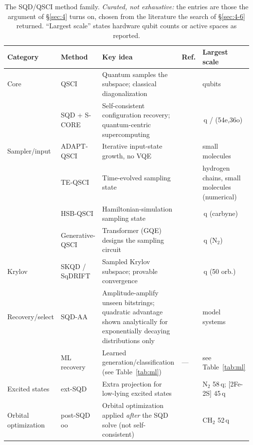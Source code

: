 \documentclass[onecolumn,a4paper]{quantumarticle}
\begin{document}
\begin{table}[t]\centering\footnotesize
\caption{The SQD/QSCI method family. \emph{Curated, not exhaustive:} the entries are those the argument of \S\ref{sec:4} turns on, chosen from the literature the search of \S\ref{sec:4-6} returned. ``Largest scale'' states hardware qubit counts or active spaces as reported.}
\label{tab:sqd}
\renewcommand{\arraystretch}{1.25}
\begin{tabularx}{\textwidth}{@{}>{\raggedright\arraybackslash}p{2.6cm} >{\raggedright\arraybackslash}p{2.0cm} >{\raggedright\arraybackslash}X >{\raggedright\arraybackslash}p{2.4cm} >{\raggedright\arraybackslash}p{1.8cm}@{}}
\toprule
\textbf{Category} & \textbf{Method} & \textbf{Key idea} & \textbf{Ref.} & \textbf{Largest scale} \\
\midrule
Core & QSCI & Quantum samples the subspace; classical diagonalization & \cite{kanno2023} & 8 qubits \\
 & SQD + S-CORE & Self-consistent configuration recovery; quantum-centric supercomputing & \cite{robledomoreno2025} & 77\,q / (54e,36o) \\
Sampler/input & ADAPT-QSCI & Iterative input-state growth, no VQE & \cite{nakagawa2024} & small molecules \\
 & TE-QSCI & Time-evolved sampling state & \cite{mikkelsen2025} & hydrogen chains, small molecules (numerical) \\
 & HSB-QSCI & Hamiltonian-simulation sampling state & \cite{sugisaki2025} & 36\,q (carbyne) \\
 & Generative-QSCI & Transformer (GQE) designs the sampling circuit & \cite{kemmoku2026} & 32\,q (N$_2$) \\
Krylov & SKQD / SqDRIFT & Sampled Krylov subspace; provable convergence & \cite{yu2025,piccinelli2025,piccinelli2026} & 100\,q (50 orb.) \\
Recovery/select & SQD-AA & Amplitude-amplify unseen bitstrings; quadratic advantage shown analytically for exponentially decaying distributions only & \cite{stockinger2026} & model systems \\
 & ML recovery & Learned generation/classification (see Table~\ref{tab:ml}) & --- & see Table~\ref{tab:ml} \\
Excited states & ext-SQD & Extra projection for low-lying excited states & \cite{barison2025} & N$_2$ 58\,q; [2Fe-2S] 45\,q \\
Orbital optimization & post-SQD oo & Orbital optimization applied \emph{after} the SQD solve (not self-consistent) & \cite{liepuoniute2025} & CH$_2$ 52\,q \\

\end{tabularx}
\end{table}
\end{document}
